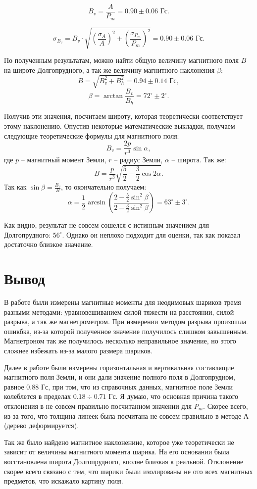 \[B_v = \frac{A}{P_m} = 0.90\pm0.06 \text{ Гс}.\]

\[\sigma_{B_v} = B_v\cdot \sqrt{\left(\frac{\sigma_A}{A}\right)^2  +  \left(\frac{\sigma_{P_m}}{P_m}\right)^2} = 0.90\pm0.06 \text{ Гс}.\]

По полученным результатам, можно найти общую величину магнитного поля $B$ на широте Долгопрудного, а так же величину магнитного наклонения $\beta$:
\[B = \sqrt{B_v^2+B_h^2} = 0.94\pm 0.14\text{ Гс},\]
\[\beta = \arctan\frac{B_v}{B_h} = 72^{\circ}\pm2^{\circ}.\]

Получив эти значения, посчитаем широту, которая теоретически соответствует этому наклонению. Опустив некоторые математические выкладки, получаем следующие теоретические формулы для магнитного поля:
\[B_v = \frac{2p}{r^3}\sin\alpha,\]
где $p$ -- магнитный момент Земли, $r$ -- радиус Земли, $\alpha$  -- широта. Так же:
\[B = \frac{p}{r^3}\sqrt{\frac{5}{2} - \frac{3}{2}\cos2\alpha}.\]
Так как
$\sin\beta = \frac{B_v}{B}$, то окончательно получаем:
\[\alpha = \frac{1}{2}\arcsin\left( \dfrac{2 - \frac{5}{2}\sin^2\beta}{2 - \frac{3}{2}\sin^2\beta}\right)  = 63^{\circ}\pm3^{\circ}.\]

Как видно, результат не совсем сошелся с истинным значением для Долгопрудного: $56^{\circ}$. Однако он неплохо подходит для оценки, так как показал достаточно близкое значение. 
\section{Вывод}
В работе были измерены магнитные моменты для неодимовых шариков тремя разными методами: уравновешиванием силой тяжести на расстоянии, силой разрыва, а так же магнетрометром. При измерении методом разрыва произошла ошикбка, из-за которой полученное значение получилось слишком завышенным. Магнетроном так же получилось несколько неправильное значение, но этого сложнее избежать из-за малого размера шариков. 

Далее в работе были измерены горизонтальная и вертикальная составлящие магнитного поля Земли, и они дали значение полного поля в Долгопрудном, равное 0.88 Гс, при том, что из справочных данных, магнитное поле Земли колеблется в пределах $0.18\div0.71$ Гс. Я думаю, что основная причина такого отклонения в не совсем правильно посчитанном значении для $P_m$. Скорее всего, из-за того, что толщина линеек была посчитана не совсем правильно в методе А (дерево деформируется).

Так же было найдено магнитное наклонениие, которое уже теоретически не зависит от величины магнитного момента шарика. На его основании была восстановлена широта Долгопрудного, вполне близкая к реальной. Отклонение скорее всего связано с тем, что шарики были изолированы не ото всех магнитных предметов, что искажало картину поля.




